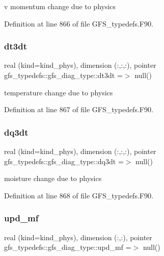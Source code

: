 v momentum change due to physics 



Definition at line 866 of file G\+F\+S\+\_\+typedefs.\+F90.

\mbox{\label{structgfs__typedefs_1_1gfs__diag__type_a261635e3ae86fa3cfdfa32e0fc37adc9}} 
\subsubsection{dt3dt}
{\footnotesize\ttfamily real (kind=kind\+\_\+phys), dimension (\+:,\+:,\+:), pointer gfs\+\_\+typedefs\+::gfs\+\_\+diag\+\_\+type\+::dt3dt =$>$ null()}



temperature change due to physics 



Definition at line 867 of file G\+F\+S\+\_\+typedefs.\+F90.

\mbox{\label{structgfs__typedefs_1_1gfs__diag__type_a1aa07bf0b006a4bb515ae85001f362d8}} 
\subsubsection{dq3dt}
{\footnotesize\ttfamily real (kind=kind\+\_\+phys), dimension (\+:,\+:,\+:), pointer gfs\+\_\+typedefs\+::gfs\+\_\+diag\+\_\+type\+::dq3dt =$>$ null()}



moisture change due to physics 



Definition at line 868 of file G\+F\+S\+\_\+typedefs.\+F90.

\mbox{\label{structgfs__typedefs_1_1gfs__diag__type_af1ef37fe847cd866d111c0440503d009}} 
\subsubsection{upd\+\_\+mf}
{\footnotesize\ttfamily real (kind=kind\+\_\+phys), dimension (\+:,\+:), pointer gfs\+\_\+typedefs\+::gfs\+\_\+diag\+\_\+type\+::upd\+\_\+mf =$>$ null()}



